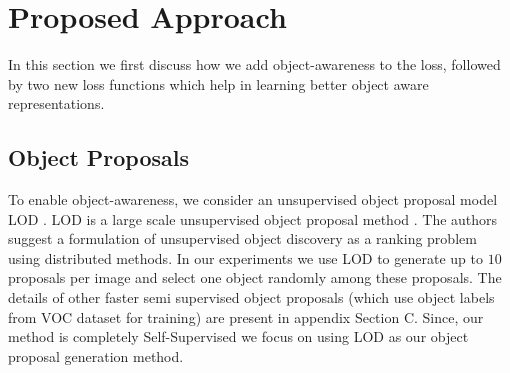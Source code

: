 \section{Proposed Approach}
In this section we first discuss how we add object-awareness to the loss, followed by two new loss functions which help in learning better object aware representations.

\label{sec:model}


\subsection{Object Proposals}
To enable object-awareness, we consider an unsupervised object proposal model LOD \cite{Vo2021LargeScaleUO}.   LOD is a large scale unsupervised object proposal method \cite{Vo2021LargeScaleUO}.   The authors suggest a formulation of unsupervised object discovery as a ranking problem using distributed methods.
In our experiments we use LOD to generate up to $10$ proposals per image and select one object randomly among these proposals. The details of other faster semi supervised object proposals (which use object labels from VOC dataset for training) are present in appendix Section C. Since, our method is completely Self-Supervised we focus on using LOD as our object proposal generation method.

